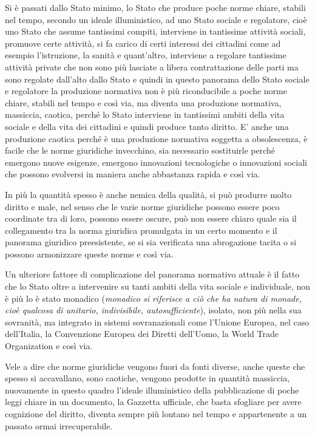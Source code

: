 Si è passati dallo Stato minimo, lo Stato che produce poche norme chiare, stabili nel tempo, secondo un ideale illuministico, ad uno Stato sociale e regolatore, cioè uno Stato che assume tantissimi compiti, interviene in tantissime attività sociali, promuove certe attività, si fa carico di certi interessi dei cittadini come ad esempio l'istruzione, la sanità e quant'altro, interviene a regolare tantissime attività private che non sono più lasciate a libera contrattazione delle parti ma sono regolate dall'alto dallo Stato e quindi in questo panorama dello Stato sociale e regolatore la produzione normativa non è più riconducibile a poche norme chiare, stabili nel tempo e così via, ma diventa una produzione normativa, massiccia, caotica, perché lo Stato interviene in tantissimi ambiti della vita sociale e della vita dei cittadini e quindi produce tanto diritto. E' anche una produzione caotica perché è una produzione normativa soggetta a obsolescenza, è facile che le norme giuridiche invecchino, sia necessario sostituirle perché emergono nuove esigenze, emergono innovazioni tecnologiche o innovazioni sociali che possono evolversi in maniera anche abbastanza rapida e così via. \par
In più la quantità spesso è anche nemica della qualità, si può produrre molto diritto e male, nel senso che le varie norme giuridiche possono essere poco coordinate tra di loro, possono essere oscure, può non essere chiaro quale sia il collegamento tra la norma giuridica promulgata in un certo momento e il panorama giuridico preesistente, se si sia verificata una abrogazione tacita o si possono armonizzare queste norme e così via. \par
Un ulteriore fattore di complicazione del panorama normativo attuale è il fatto che lo Stato oltre a intervenire su tanti ambiti della vita sociale e individuale, non è più lo è stato monadico (\textit{monadico si riferisce a ciò che ha natura di monade, cioè qualcosa di unitario, indivisibile, autosufficiente}), isolato, non più nella sua sovranità, ma integrato in sistemi sovranazionali come l'Unione Europea, nel caso dell'Italia, la Convenzione Europea dei Diretti dell'Uomo, la World Trade Organization e così via. \par
Vele a dire che norme giuridiche vengono fuori da fonti diverse, anche queste che spesso si accavallano, sono caotiche, vengono prodotte in quantità massiccia, nuovamente in questo quadro l'ideale illuministico della pubblicazione di poche leggi chiare in un documento, la Gazzetta ufficiale, che basta sfogliare per avere cognizione del diritto, diventa sempre più lontano nel tempo e appartenente a un passato ormai irrecuperabile.\par 


